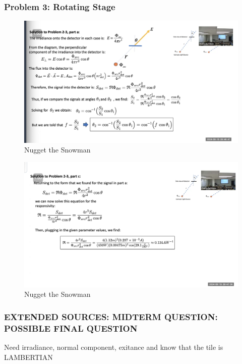 \documentclass{article}
\begin{document}
\subsubsection{Problem 3: Rotating Stage}
\begin{figure}[h!]
\centering
\includegraphics[scale=.6]{Radiometry/Week4/Notes/PSET2/P3/P3.png}
\caption{Nugget the Snowman}
\label{fig:P3}
\end{figure}


\begin{figure}[h!]
\centering
\includegraphics[scale=.6]{Radiometry/Week4/Notes/PSET2/P3/P3c.png}
\caption{Nugget the Snowman}
\label{fig:P3}
\end{figure}

\subsubsection{EXTENDED SOURCES: MIDTERM QUESTION: POSSIBLE FINAL QUESTION}

Need irradiance, normal component, exitance and know that the tile is LAMBERTIAN
\end{document}
